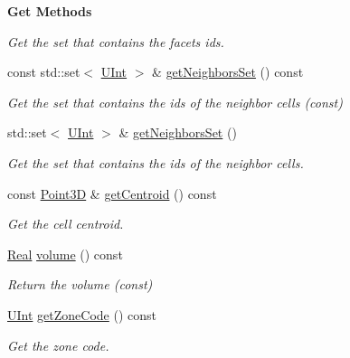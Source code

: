 \begin{Indent}{\bf Get Methods}
\begin{DoxyCompactItemize}
\begin{DoxyCompactList}\small\item\em Get the set that contains the facets ids. \end{DoxyCompactList}\item 
const std\+::set$<$ \hyperlink{namespaceFVCode3D_a4bf7e328c75d0fd504050d040ebe9eda}{U\+Int} $>$ \& \hyperlink{classFVCode3D_1_1Mesh3D_1_1Cell3D_a87f2464749df5772205e0dd76afe46e6}{get\+Neighbors\+Set} () const 
\begin{DoxyCompactList}\small\item\em Get the set that contains the ids of the neighbor cells (const) \end{DoxyCompactList}\item 
std\+::set$<$ \hyperlink{namespaceFVCode3D_a4bf7e328c75d0fd504050d040ebe9eda}{U\+Int} $>$ \& \hyperlink{classFVCode3D_1_1Mesh3D_1_1Cell3D_a6443ec2e81b11e1555cacb6df4c117b7}{get\+Neighbors\+Set} ()
\begin{DoxyCompactList}\small\item\em Get the set that contains the ids of the neighbor cells. \end{DoxyCompactList}\item 
const \hyperlink{classFVCode3D_1_1Point3D}{Point3D} \& \hyperlink{classFVCode3D_1_1Mesh3D_1_1Cell3D_a47f492dd7173a7ce4364b7137453b878}{get\+Centroid} () const 
\begin{DoxyCompactList}\small\item\em Get the cell centroid. \end{DoxyCompactList}\item 
\hyperlink{namespaceFVCode3D_a40c1f5588a248569d80aa5f867080e83}{Real} \hyperlink{classFVCode3D_1_1Mesh3D_1_1Cell3D_add653e825e5557c5f178bbe8e904b26a}{volume} () const 
\begin{DoxyCompactList}\small\item\em Return the volume (const) \end{DoxyCompactList}\item 
\hyperlink{namespaceFVCode3D_a4bf7e328c75d0fd504050d040ebe9eda}{U\+Int} \hyperlink{classFVCode3D_1_1Mesh3D_1_1Cell3D_a07529d28c440e3c23e612c73e2925a54}{get\+Zone\+Code} () const 
\begin{DoxyCompactList}\small\item\em Get the zone code. \end{DoxyCompactList}\end{DoxyCompactItemize}
\end{Indent}
